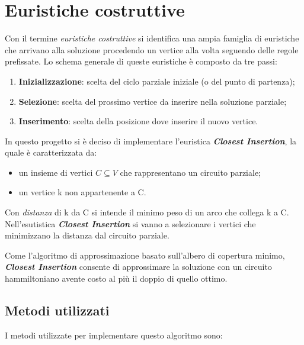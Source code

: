 \section{Euristiche costruttive}
\label{EuristicheCostruttive}

Con il termine \textit{euristiche costruttive} si identifica una ampia famiglia di euristiche che arrivano alla
soluzione procedendo un vertice alla volta seguendo delle regole prefissate. Lo schema generale di
queste euristiche è composto da tre passi:

\begin{enumerate}
    \item \textbf{Inizializzazione}: scelta del ciclo parziale iniziale (o del punto di partenza);
    \item \textbf{Selezione}: scelta del prossimo vertice da inserire nella soluzione parziale;
    \item \textbf{Inserimento}: scelta della posizione dove inserire il nuovo vertice.
\end{enumerate}

In questo progetto si è deciso di implementare l'euristica \textbf{\textit{Closest Insertion}}, la quale è caratterizzata da:

\begin{itemize}
    \item un insieme di vertici $C \subseteq V$ che rappresentano un circuito parziale;
    \item un vertice k non appartenente a C.
\end{itemize}

Con \textit{distanza} di k da C si intende il minimo peso di un arco che collega k a C. Nell'esutistica \textbf{\textit{Closest Insertion}} si vanno a selezionare i vertici che minimizzano la distanza dal circuito parziale.

Come l'algoritmo di approssimazione basato sull'albero di copertura minimo, \textbf{\textit{Closest Insertion}} consente di approssimare la soluzione con un circuito hammiltoniano avente costo al più il doppio di quello ottimo.

\subsection{Metodi utilizzati}
\label{struttureDati2}

I metodi utilizzate per implementare questo algoritmo sono:

